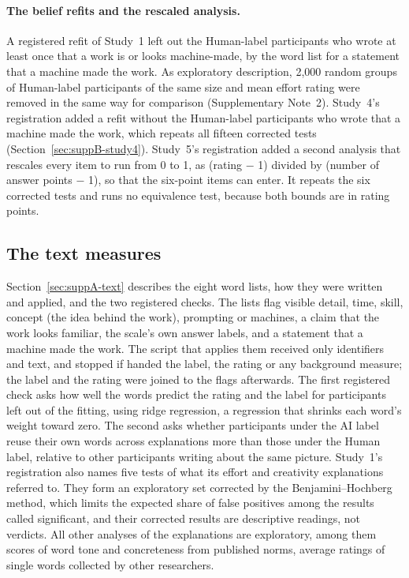 \paragraph*{The belief refits and the rescaled analysis.}
A registered refit of Study~1 left out the Human-label participants who wrote at least once that a work is or looks machine-made, by the word list for a statement that a machine made the work. As exploratory description, 2,000 random groups of Human-label participants of the same size and mean effort rating were removed in the same way for comparison (Supplementary Note~2). Study~4's registration added a refit without the Human-label participants who wrote that a machine made the work, which repeats all fifteen corrected tests (Section~\ref{sec:suppB-study4}). Study~5's registration added a second analysis that rescales every item to run from 0 to 1, as (rating $-$ 1) divided by (number of answer points $-$ 1), so that the six-point items can enter. It repeats the six corrected tests and runs no equivalence test, because both bounds are in rating points.

\subsection*{The text measures}

Section~\ref{sec:suppA-text} describes the eight word lists, how they were written and applied, and the two registered checks. The lists flag visible detail, time, skill, concept (the idea behind the work), prompting or machines, a claim that the work looks familiar, the scale's own answer labels, and a statement that a machine made the work. The script that applies them received only identifiers and text, and stopped if handed the label, the rating or any background measure; the label and the rating were joined to the flags afterwards. The first registered check asks how well the words predict the rating and the label for participants left out of the fitting, using ridge regression, a regression that shrinks each word's weight toward zero. The second asks whether participants under the AI label reuse their own words across explanations more than those under the Human label, relative to other participants writing about the same picture. Study~1's registration also names five tests of what its effort and creativity explanations referred to. They form an exploratory set corrected by the Benjamini--Hochberg method, which limits the expected share of false positives among the results called significant, and their corrected results are descriptive readings, not verdicts.\cite{benjamini1995controlling} All other analyses of the explanations are exploratory, among them scores of word tone and concreteness from published norms, average ratings of single words collected by other researchers.\cite{warriner2013norms,brysbaert2014concreteness}

